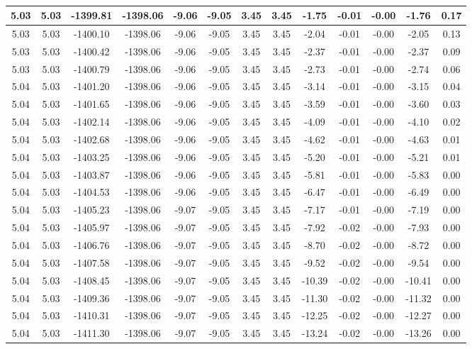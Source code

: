 \begin{table}[htbp]
\begin{adjustbox}{angle=90}
\begin{tabular}{|c|c|c|c|c|c|c|c|c|c|c|c|c|}
 5.03 & 5.03 & -1399.81 & -1398.06 & -9.06 & -9.05 & 3.45 & 3.45 & -1.75 & -0.01 & -0.00 & -1.76 & 0.17\\ \hline
 5.03 & 5.03 & -1400.10 & -1398.06 & -9.06 & -9.05 & 3.45 & 3.45 & -2.04 & -0.01 & -0.00 & -2.05 & 0.13\\ \hline
 5.03 & 5.03 & -1400.42 & -1398.06 & -9.06 & -9.05 & 3.45 & 3.45 & -2.37 & -0.01 & -0.00 & -2.37 & 0.09\\ \hline
 5.03 & 5.03 & -1400.79 & -1398.06 & -9.06 & -9.05 & 3.45 & 3.45 & -2.73 & -0.01 & -0.00 & -2.74 & 0.06\\ \hline
 5.04 & 5.03 & -1401.20 & -1398.06 & -9.06 & -9.05 & 3.45 & 3.45 & -3.14 & -0.01 & -0.00 & -3.15 & 0.04\\ \hline
 5.04 & 5.03 & -1401.65 & -1398.06 & -9.06 & -9.05 & 3.45 & 3.45 & -3.59 & -0.01 & -0.00 & -3.60 & 0.03\\ \hline
 5.04 & 5.03 & -1402.14 & -1398.06 & -9.06 & -9.05 & 3.45 & 3.45 & -4.09 & -0.01 & -0.00 & -4.10 & 0.02\\ \hline
 5.04 & 5.03 & -1402.68 & -1398.06 & -9.06 & -9.05 & 3.45 & 3.45 & -4.62 & -0.01 & -0.00 & -4.63 & 0.01\\ \hline
 5.04 & 5.03 & -1403.25 & -1398.06 & -9.06 & -9.05 & 3.45 & 3.45 & -5.20 & -0.01 & -0.00 & -5.21 & 0.01\\ \hline
 5.04 & 5.03 & -1403.87 & -1398.06 & -9.06 & -9.05 & 3.45 & 3.45 & -5.81 & -0.01 & -0.00 & -5.83 & 0.00\\ \hline
 5.04 & 5.03 & -1404.53 & -1398.06 & -9.06 & -9.05 & 3.45 & 3.45 & -6.47 & -0.01 & -0.00 & -6.49 & 0.00\\ \hline
 5.04 & 5.03 & -1405.23 & -1398.06 & -9.07 & -9.05 & 3.45 & 3.45 & -7.17 & -0.01 & -0.00 & -7.19 & 0.00\\ \hline
 5.04 & 5.03 & -1405.97 & -1398.06 & -9.07 & -9.05 & 3.45 & 3.45 & -7.92 & -0.02 & -0.00 & -7.93 & 0.00\\ \hline
 5.04 & 5.03 & -1406.76 & -1398.06 & -9.07 & -9.05 & 3.45 & 3.45 & -8.70 & -0.02 & -0.00 & -8.72 & 0.00\\ \hline
 5.04 & 5.03 & -1407.58 & -1398.06 & -9.07 & -9.05 & 3.45 & 3.45 & -9.52 & -0.02 & -0.00 & -9.54 & 0.00\\ \hline
 5.04 & 5.03 & -1408.45 & -1398.06 & -9.07 & -9.05 & 3.45 & 3.45 & -10.39 & -0.02 & -0.00 & -10.41 & 0.00\\ \hline
 5.04 & 5.03 & -1409.36 & -1398.06 & -9.07 & -9.05 & 3.45 & 3.45 & -11.30 & -0.02 & -0.00 & -11.32 & 0.00\\ \hline
 5.04 & 5.03 & -1410.31 & -1398.06 & -9.07 & -9.05 & 3.45 & 3.45 & -12.25 & -0.02 & -0.00 & -12.27 & 0.00\\ \hline
 5.04 & 5.03 & -1411.30 & -1398.06 & -9.07 & -9.05 & 3.45 & 3.45 & -13.24 & -0.02 & -0.00 & -13.26 & 0.00\\ \hline
            \end{tabular}
        \end{adjustbox}
        \caption{}
        \label{}
    \end{table}
    